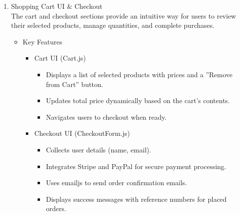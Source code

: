 \documentclass{llncs}
\begin{document}
\begin{enumerate}
        \item Shopping Cart UI \& Checkout\\
        The cart and checkout sections provide an intuitive way for users to review their selected products, manage quantities, and complete purchases.
            \begin{itemize}
                \item Key Features 
                \begin{itemize}
                    \item Cart UI (Cart.js)
                    \begin{itemize}
                        \item Displays a list of selected products with prices and a ''Remove from Cart'' button.
                        \item Updates total price dynamically based on the cart's contents.
                        \item Navigates users to checkout when ready.
                    \end{itemize}
                    \item Checkout UI (CheckoutForm.js)
                    \begin{itemize}
                        \item Collects user details (name, email).
                        \item Integrates Stripe and PayPal for secure payment processing.
                        \item Uses emailjs to send order confirmation emails.
                        \item Displays success messages with reference numbers for placed orders.\\
                    \end{itemize}
                \end{itemize}
            \end{itemize}


\end{enumerate}
\end{document}
